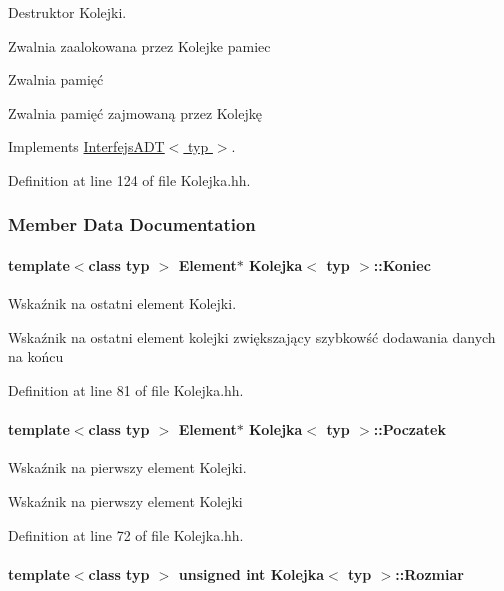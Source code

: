 Destruktor Kolejki. 

Zwalnia zaalokowana przez Kolejke pamiec

Zwalnia pamięć

Zwalnia pamięć zajmowaną przez Kolejkę 

Implements \hyperlink{class_interfejs_a_d_t_a75427479b00e3d4a0c5f9615216262ea}{Interfejs\-A\-D\-T$<$ typ $>$}.



Definition at line 124 of file Kolejka.\-hh.



\subsubsection{Member Data Documentation}
\hypertarget{class_kolejka_abc6056d0a1f4d021efd89c0152cbc594}{
\paragraph[{Koniec}]{\setlength{\rightskip}{0pt plus 5cm}template$<$class typ $>$ {\bf Element}$\ast$ {\bf Kolejka}$<$ typ $>$\-::Koniec\hspace{0.3cm}{\ttfamily [private]}}}\label{class_kolejka_abc6056d0a1f4d021efd89c0152cbc594}


Wskaźnik na ostatni element Kolejki. 

Wskaźnik na ostatni element kolejki zwiększający szybkowść dodawania danych na końcu 

Definition at line 81 of file Kolejka.\-hh.

\hypertarget{class_kolejka_aa061333b7e9f42c5782761cb15ef6ea3}{
\paragraph[{Poczatek}]{\setlength{\rightskip}{0pt plus 5cm}template$<$class typ $>$ {\bf Element}$\ast$ {\bf Kolejka}$<$ typ $>$\-::Poczatek\hspace{0.3cm}{\ttfamily [private]}}}\label{class_kolejka_aa061333b7e9f42c5782761cb15ef6ea3}


Wskaźnik na pierwszy element Kolejki. 

Wskaźnik na pierwszy element Kolejki 

Definition at line 72 of file Kolejka.\-hh.

\hypertarget{class_kolejka_ad5de4ece31be7fed6ad5fd0bbe9c3765}{
\paragraph[{Rozmiar}]{\setlength{\rightskip}{0pt plus 5cm}template$<$class typ $>$ unsigned int {\bf Kolejka}$<$ typ $>$\-::Rozmiar\hspace{0.3cm}{\ttfamily [private]}}}\label{class_kolejka_ad5de4ece31be7fed6ad5fd0bbe9c3765}


